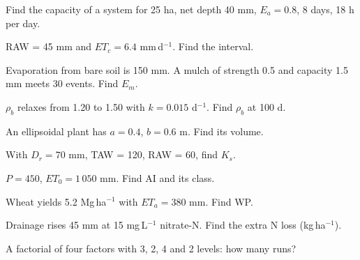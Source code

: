 \begin{exlist}
\item Find the capacity of a system for 25 ha, net depth 40 mm, $E_a=0.8$, 8 days, 18 h per day.
\item RAW = 45 mm and $ET_c=6.4$ mm\,d$^{-1}$. Find the interval.
\item Evaporation from bare soil is 150 mm. A mulch of strength 0.5 and capacity 1.5 mm meets 30 events. Find $E_m$.\exans{120 mm}
\item $\rho_b$ relaxes from 1.20 to 1.50 with $k=0.015$ d$^{-1}$. Find $\rho_b$ at 100 d.
\item An ellipsoidal plant has $a=0.4$, $b=0.6$ m. Find its volume.
\item With $D_r=70$ mm, TAW = 120, RAW = 60, find $K_s$.
\item $P=450$, $ET_0=1\,050$ mm. Find AI and its class.
\item Wheat yields 5.2 Mg\,ha$^{-1}$ with $ET_a=380$ mm. Find WP.
\item Drainage rises 45 mm at 15 mg\,L$^{-1}$ nitrate-N. Find the extra N loss (kg\,ha$^{-1}$).
\item A factorial of four factors with 3, 2, 4 and 2 levels: how many runs?
\end{exlist}
